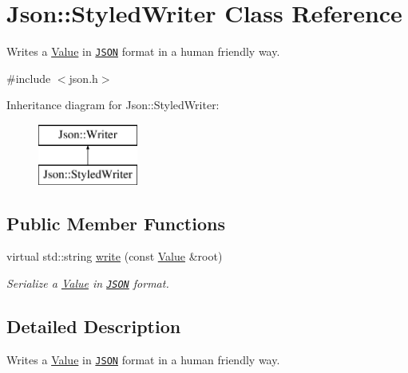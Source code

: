 \hypertarget{class_json_1_1_styled_writer}{\section{Json\+:\+:Styled\+Writer Class Reference}
\label{class_json_1_1_styled_writer}
}


Writes a \hyperlink{class_json_1_1_value}{Value} in \href{http://www.json.org}{\tt J\+S\+O\+N} format in a human friendly way.  




{\ttfamily \#include $<$json.\+h$>$}

Inheritance diagram for Json\+:\+:Styled\+Writer\+:\begin{figure}[H]
\begin{center}
\leavevmode
\includegraphics[height=2.000000cm]{class_json_1_1_styled_writer}
\end{center}
\end{figure}
\subsection*{Public Member Functions}
\begin{DoxyCompactItemize}
\item 
virtual std\+::string \hyperlink{class_json_1_1_styled_writer_a35036ba0842bc65500274c9ec30708d1}{write} (const \hyperlink{class_json_1_1_value}{Value} \&root)
\begin{DoxyCompactList}\small\item\em Serialize a \hyperlink{class_json_1_1_value}{Value} in \href{http://www.json.org}{\tt J\+S\+O\+N} format. \end{DoxyCompactList}\end{DoxyCompactItemize}


\subsection{Detailed Description}
Writes a \hyperlink{class_json_1_1_value}{Value} in \href{http://www.json.org}{\tt J\+S\+O\+N} format in a human friendly way. 

